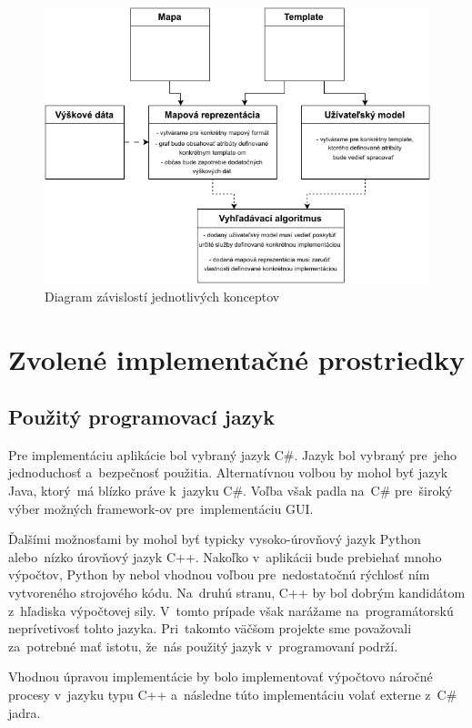 \begin{figure}[h]\centering
\includegraphics[]{img/konceptove_zavislosti}
\caption{Diagram závislostí jednotlivých konceptov} 
\label{obr01:konceptove_zavislosti}
\end{figure}

\pagebreak

\section{Zvolené implementačné prostriedky}

\subsection{Použitý programovací jazyk}

Pre implementáciu aplikácie bol vybraný jazyk C\#. Jazyk bol vybraný pre~jeho jednoduchosť a~bezpečnosť použitia. Alternatívnou volbou by mohol byť jazyk Java, ktorý~má blízko práve k~jazyku C\#. Voľba však padla na~C\# pre~široký výber možných framework-ov pre~implementáciu GUI. 

Ďalšími možnosťami by mohol byť typicky vysoko-úrovňový jazyk Python alebo~nízko úrovňový jazyk C++. Nakoľko v~aplikácii bude prebiehať mnoho výpočtov, Python by nebol vhodnou voľbou pre~nedostatočnú rýchlosť ním vytvoreného strojového kódu. Na~druhú stranu, C++ by bol dobrým kandidátom z~hľadiska výpočtovej sily. V~tomto prípade však narážame na~programátorskú neprívetivosť tohto jazyka. Pri~takomto väčšom projekte sme považovali za~potrebné mať istotu, že~nás použitý jazyk v~programovaní podrží. 

Vhodnou úpravou implementácie by bolo implementovať výpočtovo náročné procesy v~jazyku typu C++ a~následne túto implementáciu volať externe z~C\# jadra.     

